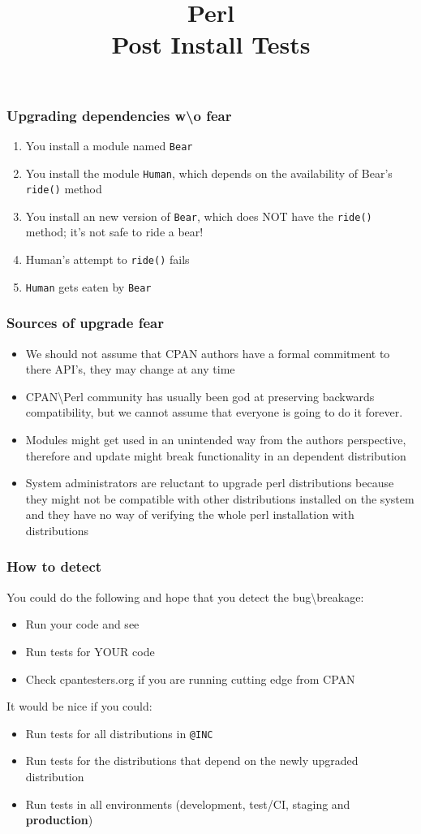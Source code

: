 \documentclass[10pt]{beamer}
\title{Perl \\ Post Install Tests}
\begin{document}
\begin{frame}
\titlepage
\end{frame}


\begin{frame}[fragile]
\frametitle{Upgrading dependencies w\textbackslash o fear}
\begin{enumerate}
  \item You install a module named \verb|Bear|
  \item You install the module \verb|Human|, which depends on the availability of Bear's \verb|ride()| method
  \item You install an new version of \verb|Bear|, which does NOT have the \verb|ride()| method; it's not safe to ride a bear!
  \item Human's attempt to \verb|ride()| fails
  \item \verb|Human| gets eaten by \verb|Bear|
\end{enumerate}
\end{frame}

\begin{frame}
\frametitle{Sources of upgrade fear}
\begin{itemize}
\item We should not assume that CPAN authors have a formal commitment to there API's, they may change at any time
\item CPAN\textbackslash Perl community has usually been god at preserving backwards compatibility, but we cannot assume that everyone is going to do it forever.
\item Modules might get used in an unintended way from the authors perspective, therefore and update might break functionality in an dependent distribution
\item System administrators are reluctant to upgrade perl distributions because they might not be compatible with other distributions installed on the system and they have no way of verifying the whole perl installation with distributions
\end{itemize}
\end{frame}

\begin{frame}[fragile]
\frametitle{How to detect}
You could do the following and hope that you detect the bug\textbackslash breakage:
\begin{itemize}
\item Run your code and see
\item Run tests for YOUR code
\item Check cpantesters.org if you are running cutting edge from CPAN
\end{itemize}
\vspace{5 mm}
It would be nice if you could:
\begin{itemize}
\item Run tests for all distributions in \verb|@INC|
\item Run tests for the distributions that depend on the newly upgraded distribution
\item Run tests in all environments (development, test/CI, staging and {\bf production})
\end{itemize}
\end{frame}
\end{document}
